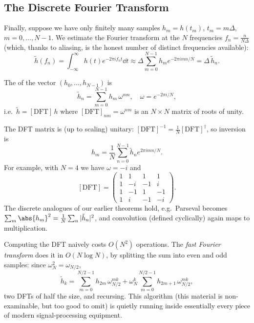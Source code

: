 \subsection{The Discrete Fourier Transform}

Finally, suppose we have only finitely many samples $h_m = h(t_m)$, $t_m = m \Delta$, $m = 0, \dots, N - 1$. We estimate the Fourier transform at the $N$ frequencies $f_n = \frac{n}{N \Delta}$ (which, thanks to aliasing, is the honest number of distinct frequencies available):
$$
\tilde{h}(f_n) = \int_{-\infty}^{\infty} h(t) e^{-2 \pi i f_n t} \dd t \approx \Delta \sum_{m = 0}^{N - 1} h_m e^{-2 \pi i m n /N} = \Delta \,\tilde{h}_n.
$$

\begin{definition}
    The  of the vector $(h_0, \dots, h_{N-1})$ is
    $$
    \tilde{h}_n = \sum_{m = 0}^{N - 1} h_m \, \omega^{mn}, \quad \omega = e^{-2\pi i /N},
    $$
    i.e.\ $\tilde{h} = [\mathrm{DFT}]\, h$ where $[\mathrm{DFT}]_{nm} = \omega^{nm}$ is an $N \times N$ matrix of roots of unity.
\end{definition}

The DFT matrix is (up to scaling) unitary: $[\mathrm{DFT}]^{-1} = \frac{1}{N}[\mathrm{DFT}]^{\dagger}$, so inversion is
$$
h_m = \frac{1}{N} \sum_{n = 0}^{N - 1} \tilde{h}_n e^{2 \pi i mn/N}.
$$
For example, with $N = 4$ we have $\omega = -i$ and
$$
[\mathrm{DFT}] = \begin{pmatrix}
    1 & 1 & 1 & 1 \\
    1 & -i & -1 & i \\
    1 & -1 & 1 & -1 \\
    1 & i & -1 & -i
\end{pmatrix}.
$$
The discrete analogues of our earlier theorems hold, e.g.\ Parseval becomes $\sum_m \abs{h_m}^2 = \frac{1}{N}\sum_n |\tilde{h}_n|^2$, and convolution (defined cyclically) again maps to multiplication.

\begin{remark}
    Computing the DFT naively costs $O(N^2)$ operations. The \emph{fast Fourier transform} does it in $O(N \log N)$, by splitting the sum into even and odd samples: since $\omega_N^2 = \omega_{N/2}$,
    $$
    \tilde{h}_k = \sum_{m = 0}^{N/2 - 1} h_{2m}\, \omega_{N/2}^{mk} + \omega_N^{k}\sum_{m = 0}^{N/2 - 1} h_{2m + 1}\, \omega_{N/2}^{mk},
    $$
    two DFTs of half the size, and recursing. This algorithm (this material is non-examinable, but too good to omit) is quietly running inside essentially every piece of modern signal-processing equipment.
\end{remark}

